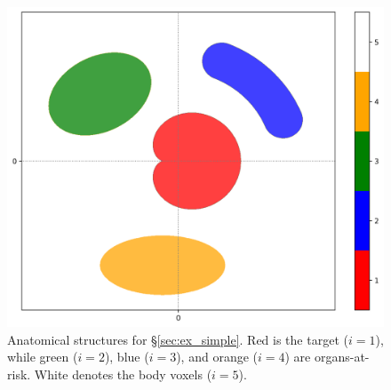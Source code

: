 \documentclass[12pt]{article}
\begin{document}
\begin{figure}
	\begin{center}
		\includegraphics[height=0.35\textheight]{figures/ex1_structures.png}
	\end{center}
	\caption{Anatomical structures for \S\ref{sec:ex_simple}. Red is the target ($i = 1$), while green ($i = 2$), blue ($i = 3$), and orange ($i = 4$) are organs-at-risk. White denotes the body voxels ($i = 5$).}
	\label{fig:ex1_structs}
\end{figure}
\end{document}
